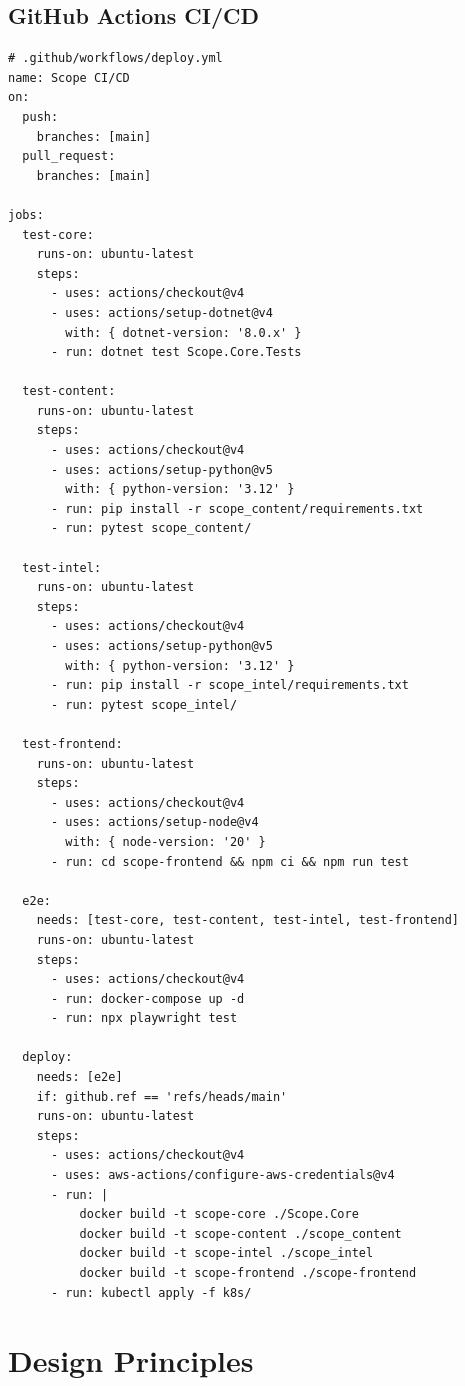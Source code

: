 \documentclass[12pt,letterpaper]{article}
\begin{document}
\subsection{GitHub Actions CI/CD}
\begin{lstlisting}[style=code]
# .github/workflows/deploy.yml
name: Scope CI/CD
on:
  push:
    branches: [main]
  pull_request:
    branches: [main]

jobs:
  test-core:
    runs-on: ubuntu-latest
    steps:
      - uses: actions/checkout@v4
      - uses: actions/setup-dotnet@v4
        with: { dotnet-version: '8.0.x' }
      - run: dotnet test Scope.Core.Tests

  test-content:
    runs-on: ubuntu-latest
    steps:
      - uses: actions/checkout@v4
      - uses: actions/setup-python@v5
        with: { python-version: '3.12' }
      - run: pip install -r scope_content/requirements.txt
      - run: pytest scope_content/

  test-intel:
    runs-on: ubuntu-latest
    steps:
      - uses: actions/checkout@v4
      - uses: actions/setup-python@v5
        with: { python-version: '3.12' }
      - run: pip install -r scope_intel/requirements.txt
      - run: pytest scope_intel/

  test-frontend:
    runs-on: ubuntu-latest
    steps:
      - uses: actions/checkout@v4
      - uses: actions/setup-node@v4
        with: { node-version: '20' }
      - run: cd scope-frontend && npm ci && npm run test

  e2e:
    needs: [test-core, test-content, test-intel, test-frontend]
    runs-on: ubuntu-latest
    steps:
      - uses: actions/checkout@v4
      - run: docker-compose up -d
      - run: npx playwright test

  deploy:
    needs: [e2e]
    if: github.ref == 'refs/heads/main'
    runs-on: ubuntu-latest
    steps:
      - uses: actions/checkout@v4
      - uses: aws-actions/configure-aws-credentials@v4
      - run: |
          docker build -t scope-core ./Scope.Core
          docker build -t scope-content ./scope_content
          docker build -t scope-intel ./scope_intel
          docker build -t scope-frontend ./scope-frontend
      - run: kubectl apply -f k8s/
\end{lstlisting}

\newpage

\section{Design Principles}
\end{document}
